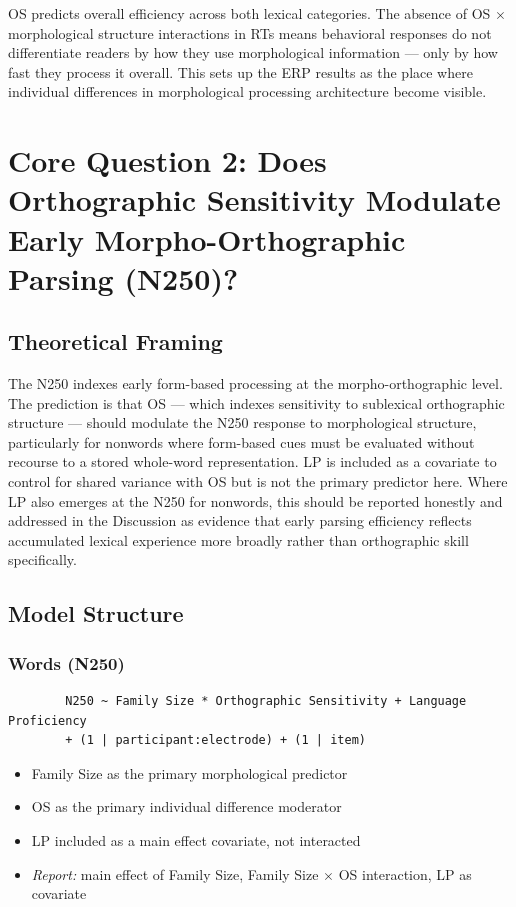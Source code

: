 \documentclass[12pt]{article}
\begin{document}
	OS predicts overall efficiency across both lexical categories. The absence of OS $\times$ morphological structure interactions in RTs means behavioral responses do not differentiate readers by how they use morphological information --- only by how fast they process it overall. This sets up the ERP results as the place where individual differences in morphological processing architecture become visible.
	
	\section{Core Question 2: Does Orthographic Sensitivity Modulate Early Morpho-Orthographic Parsing (N250)?}
	
	\subsection{Theoretical Framing}
	
	The N250 indexes early form-based processing at the morpho-orthographic level. The prediction is that OS --- which indexes sensitivity to sublexical orthographic structure --- should modulate the N250 response to morphological structure, particularly for nonwords where form-based cues must be evaluated without recourse to a stored whole-word representation. LP is included as a covariate to control for shared variance with OS but is not the primary predictor here. Where LP also emerges at the N250 for nonwords, this should be reported honestly and addressed in the Discussion as evidence that early parsing efficiency reflects accumulated lexical experience more broadly rather than orthographic skill specifically.
	
	\subsection{Model Structure}
	
	\subsubsection{Words (N250)}
	
	\begin{verbatim}
		N250 ~ Family Size * Orthographic Sensitivity + Language Proficiency
		+ (1 | participant:electrode) + (1 | item)
	\end{verbatim}
	
	\begin{itemize}
		\item Family Size as the primary morphological predictor
		\item OS as the primary individual difference moderator
		\item LP included as a main effect covariate, not interacted
		\item \textit{Report:} main effect of Family Size, Family Size $\times$ OS interaction, LP as covariate
	\end{itemize}
	
\end{document}
